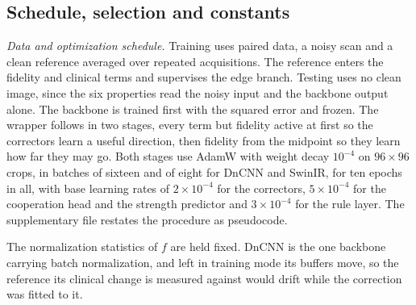 \subsection{Schedule, selection and constants}
\label{sec:paired_data}
\emph{Data and optimization schedule.} Training uses paired data, a noisy scan and a clean reference
averaged over repeated acquisitions. The reference enters the fidelity and clinical terms and
supervises the edge branch. Testing uses no clean image, since the six properties read the noisy
input and the backbone output alone. The backbone is trained first with the squared error and frozen.
The wrapper follows in two stages, every term but fidelity active at first so the correctors learn a
useful direction, then fidelity from the midpoint so they learn how far they may go. Both stages use AdamW with weight decay $10^{-4}$ on
$96 \times 96$ crops, in batches of sixteen and of eight for DnCNN and SwinIR, for ten epochs in all,
with base learning rates of $2 \times 10^{-4}$ for the correctors, $5 \times 10^{-4}$ for the
cooperation head and the strength predictor and $3 \times 10^{-4}$ for the rule layer. The
supplementary file restates the procedure as pseudocode.

The normalization statistics of $f$ are held fixed. DnCNN is the one backbone carrying batch
normalization, and left in training mode its buffers move, so the reference its clinical change is
measured against would drift while the correction was fitted to it.

